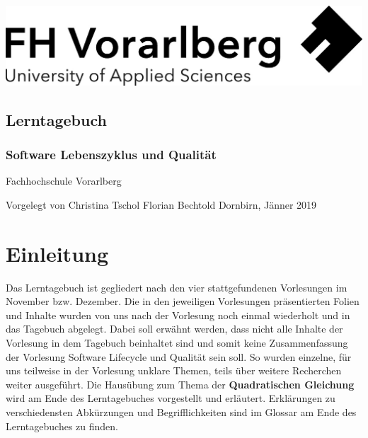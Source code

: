 \documentclass[a4paper,12pt,twoside]{scrreprt}
\begin{document}
\cleardoublepage   %
\thispagestyle{empty}
\begin{titlepage}
  \begin{flushright}
  \includegraphics[width=0.4\linewidth]{Logo-A3}
  \end{flushright}
  \begin{flushleft}
  \section*{Lerntagebuch}
  \subsection*{Software Lebenszyklus und Qualität}

  \vspace{12.5cm}
  

  Fachhochschule Vorarlberg\newline

  \vspace{0.5cm}
  
  \vspace{0.5cm}
  
  Vorgelegt von\newline
  Christina Tschol\newline
  Florian Bechtold\newline
  Dornbirn, Jänner 2019
  \end{flushleft}
\end{titlepage}


\cleardoublepage   %
\tableofcontents

\clearpage
{}
{}
\listoffigures


\chapter{Einleitung}
Das Lerntagebuch ist gegliedert nach den vier stattgefundenen Vorlesungen im November bzw. Dezember. Die in den jeweiligen Vorlesungen präsentierten Folien und Inhalte wurden von uns nach der
Vorlesung noch einmal wiederholt und in das Tagebuch abgelegt. Dabei soll erwähnt werden, dass nicht alle Inhalte der Vorlesung in dem Tagebuch beinhaltet sind und somit keine Zusammenfassung
der Vorlesung Software Lifecycle und Qualität sein soll. So wurden einzelne, für uns teilweise in der Vorlesung unklare Themen, teils über weitere Recherchen weiter ausgeführt. 
\newline
Die Hausübung zum Thema der \textbf{Quadratischen Gleichung} wird am Ende des Lerntagebuches vorgestellt und erläutert. Erklärungen zu verschiedensten Abkürzungen und Begrifflichkeiten sind im Glossar am Ende des Lerntagebuches zu finden.
\end{document}
